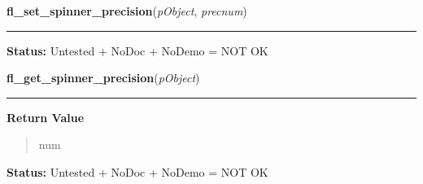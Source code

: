     \vspace{0.5ex}

\hspace{.8\funcindent}\begin{boxedminipage}{\funcwidth}

    \raggedright \textbf{fl\_set\_spinner\_precision}(\textit{pObject}, \textit{precnum})

    \vspace{-1.5ex}

    \rule{\textwidth}{0.5\fboxrule}
\setlength{\parskip}{2ex}
\setlength{\parskip}{1ex}
\textbf{Status:} Untested + NoDoc + NoDemo = NOT OK



    \end{boxedminipage}

    \label{xformslib:library:fl_get_spinner_precision}

    \vspace{0.5ex}

\hspace{.8\funcindent}\begin{boxedminipage}{\funcwidth}

    \raggedright \textbf{fl\_get\_spinner\_precision}(\textit{pObject})

    \vspace{-1.5ex}

    \rule{\textwidth}{0.5\fboxrule}
\setlength{\parskip}{2ex}
\setlength{\parskip}{1ex}
      \textbf{Return Value}
    \vspace{-1ex}

      \begin{quote}
      num

      \end{quote}

\textbf{Status:} Untested + NoDoc + NoDemo = NOT OK



    \end{boxedminipage}

    \label{xformslib:library:fl_get_spinner_input}

    \vspace{0.5ex}

